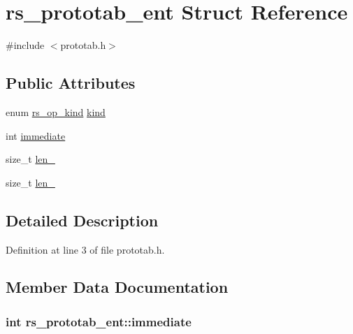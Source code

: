 \hypertarget{structrs__prototab__ent}{}\section{rs\+\_\+prototab\+\_\+ent Struct Reference}
\label{structrs__prototab__ent}


{\ttfamily \#include $<$prototab.\+h$>$}

\subsection*{Public Attributes}
\begin{DoxyCompactItemize}
\item 
enum \hyperlink{command_8h_a86c9292a5b5238cddbe4d0a158414c80}{rs\+\_\+op\+\_\+kind} \hyperlink{structrs__prototab__ent_a60cdade47d5c7ab64059db7ae7f326e9}{kind}
\item 
int \hyperlink{structrs__prototab__ent_ab78c95a94170821eff983cc5fc983269}{immediate}
\item 
size\+\_\+t \hyperlink{structrs__prototab__ent_a62141461a0f9fcf86d7e137a643df00f}{len\+\_}
\item 
size\+\_\+t \hyperlink{structrs__prototab__ent_ae15989881590213a8e63aa3e5e0a6447}{len\+\_}
\end{DoxyCompactItemize}


\subsection{Detailed Description}


Definition at line 3 of file prototab.\+h.



\subsection{Member Data Documentation}
\hypertarget{structrs__prototab__ent_ab78c95a94170821eff983cc5fc983269}{}
\subsubsection[{immediate}]{\setlength{\rightskip}{0pt plus 5cm}int rs\+\_\+prototab\+\_\+ent\+::immediate}\label{structrs__prototab__ent_ab78c95a94170821eff983cc5fc983269}


